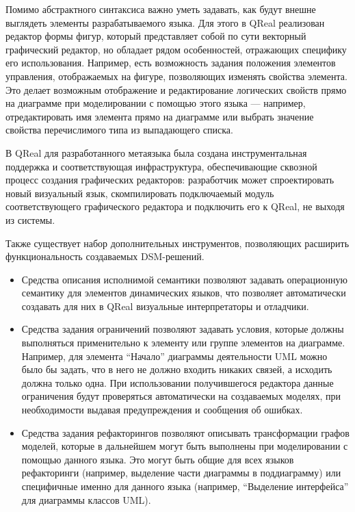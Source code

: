 \documentclass[a4]{article}
\begin{document}
Помимо абстрактного синтаксиса важно уметь задавать, как будут внешне выглядеть элементы разрабатываемого языка. Для этого в QReal реализован редактор формы фигур, который представляет собой по сути векторный графический редактор, но обладает рядом особенностей, отражающих специфику его использования. Например, есть возможность задания положения элементов управления, отображаемых на фигуре, позволяющих изменять свойства элемента. Это делает возможным отображение и редактирование логических свойств прямо на диаграмме при моделировании с помощью этого языка --- например, отредактировать имя элемента прямо на диаграмме или выбрать значение свойства перечислимого типа из выпадающего списка.

В QReal для разработанного метаязыка была создана инструментальная поддержка и соответствующая инфраструктура, обеспечивающие сквозной процесс создания графических редакторов: разработчик может спроектировать новый визуальный язык, скомпилировать подключаемый модуль соответствующего графического редактора и подключить его к QReal, не выходя из системы. 

Также существует набор дополнительных инструментов, позволяющих расширить функциональность создаваемых DSM-решений. 

\begin{itemize}
 \item Средства описания исполнимой семантики позволяют задавать операционную семантику для элементов динамических языков, что позволяет автоматически создавать для них в QReal визуальные интерпретаторы и отладчики.
 \item Средства задания ограничений позволяют задавать условия, которые должны выполняться применительно к элементу или группе элементов на диаграмме. Например, для элемента ``Начало'' диаграммы деятельности UML можно было бы задать, что в него не должно входить никаких связей, а исходить должна только одна. При использовании получившегося редактора данные ограничения будут проверяться автоматически на создаваемых моделях, при необходимости выдавая предупреждения и сообщения об ошибках.
 \item Средства задания рефакторингов позволяют описывать трансформации графов моделей, которые в дальнейшем могут быть выполнены при моделировании с помощью данного языка. Это могут быть общие для всех языков рефакторинги (например, выделение части диаграммы в поддиаграмму) или специфичные именно для данного языка (например, ``Выделение интерфейса'' для диаграммы классов UML).
\end{itemize}
\end{document}
